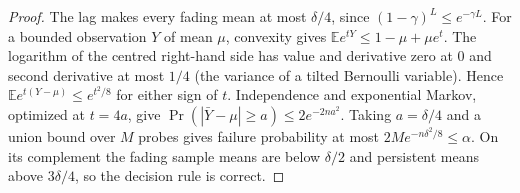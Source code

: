 \begin{proof}
The lag makes every fading mean at most $\delta/4$, since
$(1-\gamma)^L\le e^{-\gamma L}$.
For a bounded observation $Y$ of mean $\mu$, convexity gives
$\mathbb E e^{tY}\le1-\mu+\mu e^t$. The logarithm of the centred
right-hand side has value and derivative zero at $0$ and second derivative
at most $1/4$ (the variance of a tilted Bernoulli variable). Hence
$\mathbb E e^{t(Y-\mu)}\le e^{t^2/8}$ for either sign of $t$.
Independence and exponential Markov, optimized at $t=4a$, give
$\Pr(|\bar Y-\mu|\ge a)\le2e^{-2na^2}$.
Taking $a=\delta/4$ and a union bound over $M$ probes gives failure
probability at most $2M e^{-n\delta^2/8}\le\alpha$.
On its complement the fading sample means are below $\delta/2$ and
persistent means above $3\delta/4$, so the decision rule is correct.
\end{proof}
